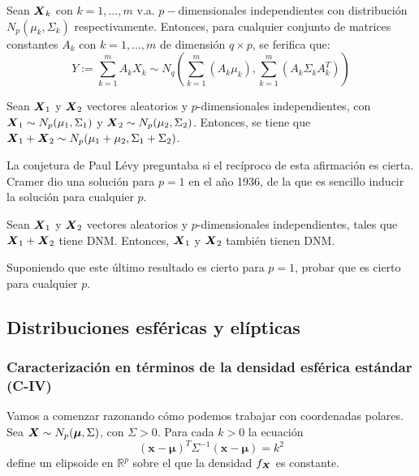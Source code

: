 \begin{nprop}
  Sean $\boldsymbol{X}_k$ con $k = 1,\dots,m$ v.a. $p-$dimensionales independientes con distribución $N_p(\mu_k, \Sigma_k)$ respectivamente. Entonces, para cualquier conjunto de matrices constantes $A_k$ con $k = 1,\dots, m$ de dimensión $q\times p$, se ferifica que:
  \[
Y:= \sum_{k=1}^{m} A_k X_k \sim N_q(\sum_{k=1}^m(A_k \mu_k), \sum_{k=1}^m(A_k \Sigma_k A_k^T))
  \]
\end{nprop}

\begin{nth}[Cramer]
  Sean $\boldsymbol{X}_1$ y $\boldsymbol{X}_2$ vectores aleatorios y $p$-dimensionales independientes, con $\boldsymbol{X}_1 \sim N_p(\mu_1, \Sigma_1)$ y $\boldsymbol{X}_2 \sim N_p(\mu_2, \Sigma_2)$. Entonces, se tiene que $\boldsymbol{X}_1 + \boldsymbol{X}_2 \sim N_p(\mu_1 + \mu_2, \Sigma_1 + \Sigma_2)$.
\end{nth}

La conjetura de Paul Lévy preguntaba si el recíproco de esta afirmación es cierta. Cramer dio una solución para $p=1$ en el año 1936, de la que es sencillo inducir la solución para cualquier $p$. 

\begin{nth}
  Sean $\boldsymbol{X}_1$ y $\boldsymbol{X}_2$ vectores aleatorios y $p$-dimensionales independientes, tales que $\boldsymbol{X}_1 + \boldsymbol{X}_2$ tiene DNM. Entonces, $\boldsymbol{X}_1$ y $\boldsymbol{X}_2$ también tienen DNM.
\end{nth}

\begin{ejer}
  Suponiendo que este último resultado es cierto para $p=1$, probar que es cierto para cualquier $p$.
\end{ejer}

\subsection{Distribuciones esféricas y elípticas}

\subsubsection{Caracterización en términos de la densidad esférica estándar (C-IV)}

Vamos a comenzar razonando cómo podemos trabajar con coordenadas polares. Sea $\boldsymbol{X} \sim N_p(\boldsymbol \mu, \Sigma)$, con $\Sigma > 0$. Para cada $k > 0$ la ecuación \[(\boldsymbol x - \boldsymbol \mu)^T \Sigma^{-1}(\boldsymbol x - \boldsymbol \mu) = k^2\] define un elipsoide en $\mathbb R^p$ sobre el que la densidad $f_{\boldsymbol{X}}$ es constante. 

